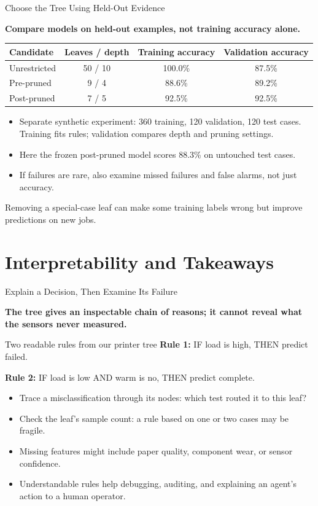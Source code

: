\documentclass[aspectratio=169,10pt]{beamer}
\newcommand{\conceptlead}[1]{%
  {\normalsize\bfseries\color{CalPolyGreen}#1\par}%
}
\begin{document}
\begin{frame}{Choose the Tree Using Held-Out Evidence}
\small
\conceptlead{Compare models on held-out examples, not training accuracy alone.}
{\centering
\renewcommand{\arraystretch}{1.32}
\begin{tabular}{lccc}
\toprule
\textbf{Candidate} & \textbf{Leaves / depth} & \textbf{Training accuracy} & \textbf{Validation accuracy}\\
\midrule
Unrestricted & 50 / 10 & 100.0\% & 87.5\%\\
Pre-pruned & 9 / 4 & 88.6\% & 89.2\%\\
Post-pruned & 7 / 5 & 92.5\% & 92.5\%\\
\bottomrule
\end{tabular}
\par}
\begin{itemize}
 \item Separate synthetic experiment: 360 training, 120 validation, 120 test cases. Training fits rules; validation compares depth and pruning settings.
 \item Here the frozen post-pruned model scores 88.3\% on untouched test cases.
 \item If failures are rare, also examine missed failures and false alarms, not just accuracy.
\end{itemize}
\begin{keyidea}Removing a special-case leaf can make some training labels wrong but improve predictions on new jobs.\end{keyidea}
\end{frame}

\section{Interpretability and Takeaways}

\begin{frame}{Explain a Decision, Then Examine Its Failure}
\small
\conceptlead{The tree gives an inspectable chain of reasons; it cannot reveal what the sensors never measured.}
\begin{block}{Two readable rules from our printer tree}
\textbf{Rule 1:} IF load is high, THEN predict failed.\par\smallskip
\textbf{Rule 2:} IF load is low AND warm is no, THEN predict complete.
\end{block}
\begin{itemize}
 \item Trace a misclassification through its nodes: which test routed it to this leaf?
 \item Check the leaf's sample count: a rule based on one or two cases may be fragile.
 \item Missing features might include paper quality, component wear, or sensor confidence.
 \item Understandable rules help debugging, auditing, and explaining an agent's action to a human operator.
\end{itemize}
\end{frame}
\end{document}
